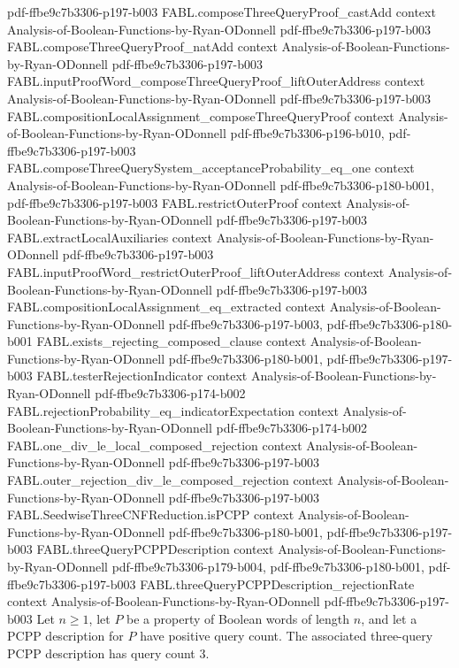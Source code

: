 \begin{theorem}
  {pdf-ffbe9c7b3306-p197-b003}
\proofstep
  {FABL.composeThreeQueryProof_castAdd}
  {context}
  {Analysis-of-Boolean-Functions-by-Ryan-ODonnell}
  {pdf-ffbe9c7b3306-p197-b003}
\proofstep
  {FABL.composeThreeQueryProof_natAdd}
  {context}
  {Analysis-of-Boolean-Functions-by-Ryan-ODonnell}
  {pdf-ffbe9c7b3306-p197-b003}
\proofstep
  {FABL.inputProofWord_composeThreeQueryProof_liftOuterAddress}
  {context}
  {Analysis-of-Boolean-Functions-by-Ryan-ODonnell}
  {pdf-ffbe9c7b3306-p197-b003}
\proofstep
  {FABL.compositionLocalAssignment_composeThreeQueryProof}
  {context}
  {Analysis-of-Boolean-Functions-by-Ryan-ODonnell}
  {pdf-ffbe9c7b3306-p196-b010,
    pdf-ffbe9c7b3306-p197-b003}
\proofstep
  {FABL.composeThreeQuerySystem_acceptanceProbability_eq_one}
  {context}
  {Analysis-of-Boolean-Functions-by-Ryan-ODonnell}
  {pdf-ffbe9c7b3306-p180-b001,
    pdf-ffbe9c7b3306-p197-b003}
\proofstep
  {FABL.restrictOuterProof}
  {context}
  {Analysis-of-Boolean-Functions-by-Ryan-ODonnell}
  {pdf-ffbe9c7b3306-p197-b003}
\proofstep
  {FABL.extractLocalAuxiliaries}
  {context}
  {Analysis-of-Boolean-Functions-by-Ryan-ODonnell}
  {pdf-ffbe9c7b3306-p197-b003}
\proofstep
  {FABL.inputProofWord_restrictOuterProof_liftOuterAddress}
  {context}
  {Analysis-of-Boolean-Functions-by-Ryan-ODonnell}
  {pdf-ffbe9c7b3306-p197-b003}
\proofstep
  {FABL.compositionLocalAssignment_eq_extracted}
  {context}
  {Analysis-of-Boolean-Functions-by-Ryan-ODonnell}
  {pdf-ffbe9c7b3306-p197-b003,
    pdf-ffbe9c7b3306-p180-b001}
\proofstep
  {FABL.exists_rejecting_composed_clause}
  {context}
  {Analysis-of-Boolean-Functions-by-Ryan-ODonnell}
  {pdf-ffbe9c7b3306-p180-b001,
    pdf-ffbe9c7b3306-p197-b003}
\proofstep
  {FABL.testerRejectionIndicator}
  {context}
  {Analysis-of-Boolean-Functions-by-Ryan-ODonnell}
  {pdf-ffbe9c7b3306-p174-b002}
\proofstep
  {FABL.rejectionProbability_eq_indicatorExpectation}
  {context}
  {Analysis-of-Boolean-Functions-by-Ryan-ODonnell}
  {pdf-ffbe9c7b3306-p174-b002}
\proofstep
  {FABL.one_div_le_local_composed_rejection}
  {context}
  {Analysis-of-Boolean-Functions-by-Ryan-ODonnell}
  {pdf-ffbe9c7b3306-p197-b003}
\proofstep
  {FABL.outer_rejection_div_le_composed_rejection}
  {context}
  {Analysis-of-Boolean-Functions-by-Ryan-ODonnell}
  {pdf-ffbe9c7b3306-p197-b003}
\proofstep
  {FABL.SeedwiseThreeCNFReduction.isPCPP}
  {context}
  {Analysis-of-Boolean-Functions-by-Ryan-ODonnell}
  {pdf-ffbe9c7b3306-p180-b001,
    pdf-ffbe9c7b3306-p197-b003}
\proofstep
  {FABL.threeQueryPCPPDescription}
  {context}
  {Analysis-of-Boolean-Functions-by-Ryan-ODonnell}
  {pdf-ffbe9c7b3306-p179-b004,
    pdf-ffbe9c7b3306-p180-b001,
    pdf-ffbe9c7b3306-p197-b003}
\proofstep
  {FABL.threeQueryPCPPDescription_rejectionRate}
  {context}
  {Analysis-of-Boolean-Functions-by-Ryan-ODonnell}
  {pdf-ffbe9c7b3306-p197-b003}
Let $n\ge 1$, let $P$ be a property of Boolean words of length $n$, and let a PCPP
description for $P$ have positive query count. The associated three-query PCPP
description has query count $3$.
\end{theorem}

